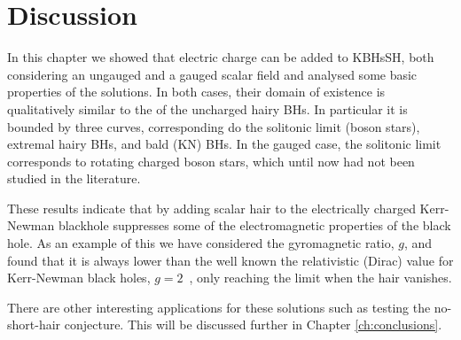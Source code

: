 \section{Discussion}
\label{sec_remarks}

In this chapter we showed that electric charge can be added to KBHsSH, both considering an ungauged and a gauged scalar field and analysed some basic properties of the solutions.
In both cases, their domain of existence is qualitatively similar to the of the uncharged hairy BHs.
In particular it is bounded by three curves, corresponding do the solitonic limit (boson stars), extremal hairy BHs, and bald (KN) BHs.
In the gauged case, the solitonic limit corresponds to rotating charged boson stars, which until now had not been studied in the literature. 

These results indicate that by adding scalar hair to the electrically charged Kerr-Newman blackhole suppresses some of the electromagnetic properties of the black hole.
As an example of this we have considered the gyromagnetic ratio, $g$, and found that it is always lower than the well known the relativistic (Dirac) value for Kerr-Newman black holes, $g=2$~\cite{Carter:1968rr}, only reaching the limit when the hair vanishes.

There are other interesting applications for these solutions such as testing the no-short-hair conjecture.
This will be discussed further in Chapter \ref{ch:conclusions}.
